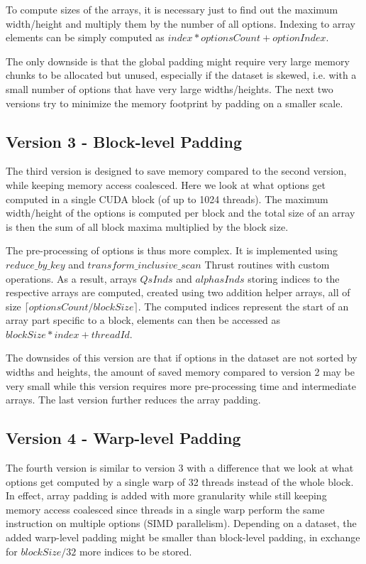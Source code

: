 To compute sizes of the arrays, it is necessary just to find out the maximum width/height
and multiply them by the number of all options. Indexing to array elements can be simply computed as $\mathit{index} * \mathit{optionsCount} + \mathit{optionIndex}$.

The only downside is that the global padding might require very large memory chunks to be allocated but unused, especially if the dataset is skewed, i.e. with a small number of options that have very large widths/heights. The next two versions try to minimize the memory footprint by padding on a smaller scale.

\subsection*{Version 3 - Block-level Padding}
The third version is designed to save memory compared to the second version, while keeping memory access coalesced. Here we look at what options get computed in a single CUDA block (of up to 1024 threads). The maximum width/height of the options is computed per block and the total size of an array is then the sum of all block maxima multiplied by the block size.

The pre-processing of options is thus more complex. It is implemented using $\mathit{reduce\_by\_key}$ and $\mathit{transform\_inclusive\_scan}$ Thrust routines with custom operations. As a result, arrays $\mathit{QsInds}$ and $\mathit{alphasInds}$ storing indices to the respective arrays are computed, created using two addition helper arrays, all of size $\lceil \mathit{optionsCount} / \mathit{blockSize} \rceil$. The computed indices represent the start of an array part specific to a block, elements can then be accessed as $\mathit{blockSize} * \mathit{index} + \mathit{threadId}$.

The downsides of this version are that if options in the dataset are not sorted by widths and heights, the amount of saved memory compared to version 2 may be very small while this version requires more pre-processing time and intermediate arrays. The last version further reduces the array padding.

\subsection*{Version 4 - Warp-level Padding}
The fourth version is similar to version 3 with a difference that we look at what options get computed by a single warp of 32 threads instead of the whole block. In effect, array padding is added with more granularity while still keeping memory access coalesced since threads in a single warp perform the same instruction on multiple options (SIMD parallelism). Depending on a dataset, the added warp-level padding might be smaller than block-level padding, in exchange for $\mathit{blockSize} / 32$ more indices to be stored.

